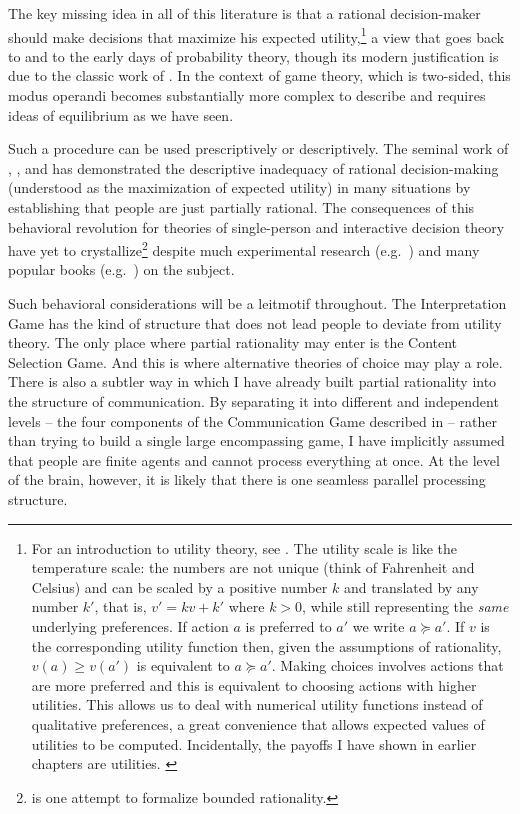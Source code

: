 The key missing idea in all of this literature is that a rational decision-maker should make decisions that maximize his expected utility,\footnote{For an introduction to utility theory, see \citet[Chapter~1]{myerson:gt}. The utility scale is like the temperature scale: the numbers are not unique (think of Fahrenheit and Celsius) and can be scaled by a positive number $k$ and translated by any number $k'$, that is, $v' = kv + k'$ where $k > 0$, while still representing the \emph{same} underlying preferences. If action $a$ is preferred to $a'$ we write $a \succeq a'$. If $v$ is the corresponding utility function then, given the assumptions of rationality, $v(a) \geq v(a')$ is equivalent to $a \succeq a'$. Making choices involves actions that are more preferred and this is equivalent to choosing actions with higher utilities. This allows us to deal with numerical utility functions instead of qualitative preferences, a great convenience that allows expected values of utilities to be computed. Incidentally, the payoffs I have shown in earlier chapters are utilities. \label{foot:utility}} a view that goes back to \citet{bernoulli:entmr} and to the early days of probability theory, though its modern justification is due to the classic work of \citet{vnm:tgeb}. In the context of game theory, which is two-sided, this modus operandi becomes substantially more complex to describe and requires ideas of equilibrium as we have seen. 

Such a procedure can be used prescriptively or descriptively. The seminal work of \citet{allais:risk}, \citet{simon:bmrc, simon:rcse}, and \citet{kt:pt, kst:juu} has demonstrated the descriptive inadequacy of rational decision-making (understood as the maximization of expected utility) in many situations by establishing that people are just partially rational. The consequences of this behavioral revolution for theories of single-person and interactive decision theory have yet to crystallize\footnote{\citet{rubinstein:mbr} is one attempt to formalize bounded rationality.} despite much experimental research (e.g.\ \citealt{camerer:bgt,vcsb:bcv}) and many popular books (e.g.\ \citealt{ariely:pi}) on the subject. 

Such behavioral considerations will be a leitmotif throughout. The Interpretation Game has the kind of structure that does not lead people to deviate from utility theory. The only place where partial rationality may enter is the Content Selection Game. And this is where alternative theories of choice may play a role. There is also a subtler way in which I have already built partial rationality into the structure of communication. By separating it into different and independent levels -- the four components of the Communication Game described in  -- rather than trying to build a single large encompassing game, I have implicitly assumed that people are finite agents and cannot process everything at once. At the level of the brain, however, it is likely that there is one seamless parallel processing structure.


